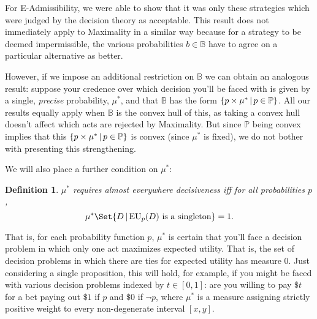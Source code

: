 \documentclass[a4paper]{article}
\newtheorem{definition}{Definition}
\renewcommand\P{\mathbb{P}} %
\newcommand\EU{\mathrm{EU}}
\newcommand{\IB}{\mathbb{B}}
\newcommand{\IP}{\P}
\newcommand{\pb}{b}
\newcommand{\todoinfo}[2][]{\todo[backgroundcolor=orange!80,bordercolor=black,linecolor=gray!80, #1,inline,caption={}]{#2}}
\renewcommand{\color}[1]{}
\newcommand\SetDelimiter[1][]{
	\nonscript\,#1\vert \allowbreak \nonscript\,\mathopen{}}
\providecommand\given{\SetDelimiter}
\newenvironment{CCM rewritten}
{\begingroup\color{blue}} %
{\endgroup}              %
\begin{document}
For E-Admissibility, we were able to show that it was only these strategies which were judged by the decision theory as acceptable. This result does not immediately apply to Maximality in a similar way because for a strategy to be deemed impermissible, the various probabilities $\pb\in \IB$ have to agree on a particular alternative as better.

However, if we impose an additional restriction on $\IB$ we can obtain an analogous result: suppose your credence over which decision you'll be faced with is given by a single, \emph{precise} probability, $\mu^*$, and that $\IB$ has the form $\{p\times \mu^*\given p\in \IP\}$. {\color{violet} All our results equally apply when $\IB$ is the convex hull of this, as taking a convex hull doesn't affect which acts are rejected by Maximality. But since $\IP$ being convex implies that this $\{p\times\mu^*\given p\in\IP\}$ is convex (since $\mu^*$ is fixed), we do not bother with presenting this strengthening. }\todoinfo{check!!!}


We will also place a further condition on $\mu^*$:
\begin{definition}\label{def:suff spread}
	$\mu^*$ \emph{requires almost everywhere decisiveness} iff for all probabilities $p$,$$\mu^*\Set{D\given \EU_p(D)\text{ is a singleton}}=1.$$ 
\end{definition}
That is, for each probability function $p$, $\mu^*$ is certain that you'll face a decision problem in which only one act maximizes expected utility. That is, the set of decision problems in which there are ties for expected utility has measure 0.
Just considering a single proposition, this will hold, for example, if you might be faced with various decision problems indexed by $t\in[0,1]$: are you willing to pay $\$t$ for a bet paying out $\$1$ if $p$ and $\$0$ if $\neg p$, where $\mu^*$ is a measure assigning strictly positive weight to every non-degenerate interval $[x,y]$. 

\end{document}
